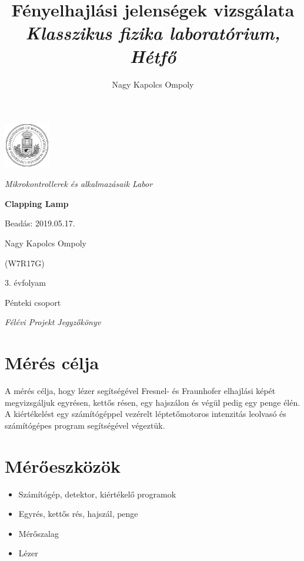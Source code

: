 \documentclass[a4paper,11pt]{article}
\author{Nagy Kapolcs Ompoly}
\title{Fényelhajlási jelenségek vizsgálata \\ \textsl{\small{Klasszikus fizika laboratórium, Hétfő}}}
\date{ }
\begin{document}
\begin{titlepage}
	\centering
	\includegraphics[width=0.15\textwidth]{eltecimer.jpg}\par
	\vspace{1cm}
	{\Large\itshape Mikrokontrollerek és alkalmazásaik Labor\par}
	{\huge\bfseries Clapping Lamp\par}
	
	\vfill
	
	\raggedleft
	Beadás: 2019.05.17.\par
	\vspace{0.5cm}
	Nagy Kapolcs Ompoly\par
	(W7R17G)\par
	3. évfolyam\par
	Pénteki csoport\par
	
	\vspace{0.5cm}

	\centering
	{\small\itshape Félévi Projekt Jegyzőkönyv \par}
\end{titlepage}
\clearpage
\setcounter{page}{1}
\newpage
\renewcommand{\thesection}{\Roman{section}}
\renewcommand{\thesubsection}{\thesection.\arabic{subsection}}
\renewcommand{\thesubsubsection}{\thesubsection.\arabic{subsubsection}}
\section{Mérés célja}
A mérés célja, hogy lézer segítségével Fresnel- és Fraunhofer elhajlási képét megvizsgáljuk egyrésen, kettős résen, egy hajszálon és végül pedig egy penge élén. A kiértékelést egy számítógéppel vezérelt léptetőmotoros intenzitás leolvasó és számítógépes program segítségével végeztük.

\section{Mérőeszközök}

\begin{itemize}
	\item Számítógép, detektor, kiértékelő programok
	\item Egyrés, kettős rés, hajszál, penge
	\item Mérőszalag
	\item Lézer 
\end{itemize}
\end{document}
